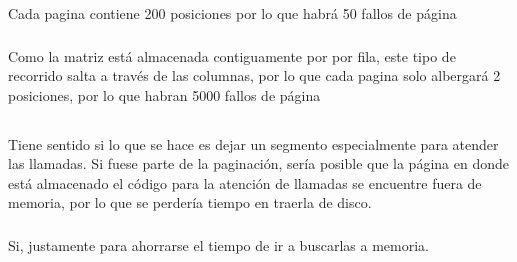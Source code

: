 Cada pagina contiene 200 posiciones por lo que habrá 50 fallos de página

\subsubsection{}

Como la matriz está almacenada contiguamente por por fila, este tipo de
recorrido salta a través de las columnas, por lo que cada pagina solo
albergará 2 posiciones, por lo que habran 5000 fallos de página

\setcounter{subsection}{12}
\subsection{}

\subsubsection{}

Tiene sentido si lo que se hace es dejar un segmento especialmente para
atender las llamadas. Si fuese parte de la paginación, sería posible que la
página en donde está almacenado el código para la atención de llamadas se
encuentre fuera de memoria, por lo que se perdería tiempo en traerla de disco.

\subsubsection{}

Si, justamente para ahorrarse el tiempo de ir a buscarlas a memoria.